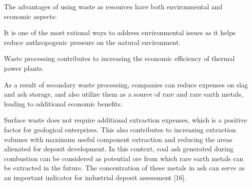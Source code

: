 \begin{multicols}{2}
The advantages of using waste as resources have both environmental and
economic aspects:

It is one of the most rational ways to address environmental issues as
it helps reduce anthropogenic pressure on the natural environment.

Waste processing contributes to increasing the economic efficiency of
thermal power plants.

As a result of secondary waste processing, companies can reduce expenses
on slag and ash storage, and also utilize them as a source of rare and
rare earth metals, leading to additional economic benefits.

Surface waste does not require additional extraction expenses, which is
a positive factor for geological enterprises. This also contributes to
increasing extraction volumes with maximum useful component extraction
and reducing the areas alienated for deposit development. In this
context, coal ash generated during combustion can be considered as
potential ore from which rare earth metals can be extracted in the
future. The concentration of these metals in ash can serve as an
important indicator for industrial deposit assessment {[}16{]}.
\end{multicols}

